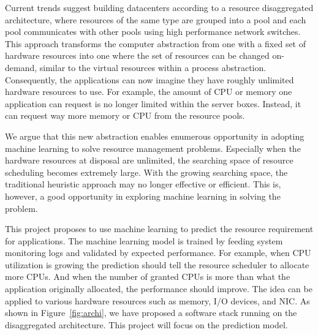 Current trends suggest building datacenters according to a resource
disaggregated architecture, where resources of the same type are
grouped into a pool and each pool communicates with other pools
using high performance network switches.  This approach transforms
the computer abstraction from one with a fixed set of hardware
resources into one where the set of resources can be changed
on-demand, similar to the virtual resources within a process
abstraction.  Consequently, the applications can now imagine
they have roughly unlimited hardware resources to use.
For example, the amount of CPU or memory one application can
request is no longer limited within the server boxes.
Instead, it can request way more memory or CPU from the resource pools.

We argue that this new abstraction enables enumerous opportunity in
adopting machine learning to solve resource management problems.
Especially when the hardware resources at disposal are unlimited,
the searching space of resource scheduling becomes extremely large.
With the growing searching space, the traditional heuristic approach
may no longer effective or efficient. This is, however, a good opportunity
in exploring machine learning in solving the problem.

This project proposes to use machine learning to predict the resource
requirement for applications.  The machine learning model is trained
by feeding system monitoring logs and validated by expected performance.
For example, when CPU utilization is growing the prediction should tell
the resource scheduler to allocate more CPUs.  And when the number of
granted CPUs is more than what the application originally allocated,
the performance should improve.  The idea can be applied to various
hardware resources such as memory, I/O devices, and NIC.
As shown in Figure~\ref{fig:archi}, we have proposed a software
stack running on the disaggregated architecture.
This project will focus on the prediction model.
